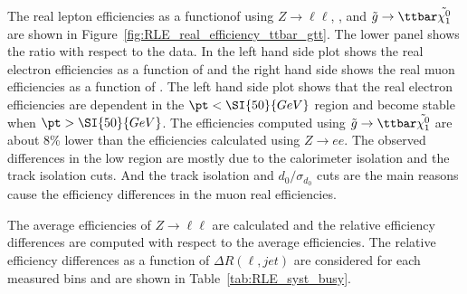 The real lepton efficiencies as a functionof \pt using $Z\to\ell\ell$, \ttbar, and $\tilde{g}\to\ttbar\tilde{\chi^{0}_{1}}$ are shown in Figure~\ref{fig:RLE_real_efficiency_ttbar_gtt}.
The lower panel shows the ratio with respect to the data.
In the left hand side plot shows the real electron efficiencies as a function of \pt and the right hand side shows the real muon efficiencies as a function of \pt. 
The left hand side plot shows that the real electron efficiencies are \pt dependent in the $\pt<\SI{50}{GeV}$ region and become stable when $\pt>\SI{50}{GeV}$.
The efficiencies computed using $\tilde{g}\to\ttbar\tilde{\chi^{0}_{1}}$ are about 8\% lower than the efficiencies calculated using $Z\to ee$.
The observed differences in the low \pt region are mostly due to the calorimeter isolation and the track isolation cuts.
And the track isolation and $d_{0}/\sigma_{d_{0}}$ cuts are the main reasons cause the efficiency differences in the muon real efficiencies.

The average efficiencies of $Z\to\ell\ell$ are calculated and the relative efficiency differences are computed with respect to the average efficiencies.
The relative efficiency differences as a function of $\Delta R(\ell, jet)$ are considered for each measured \pt bins and are shown in Table~\ref{tab:RLE_syst_busy}.

